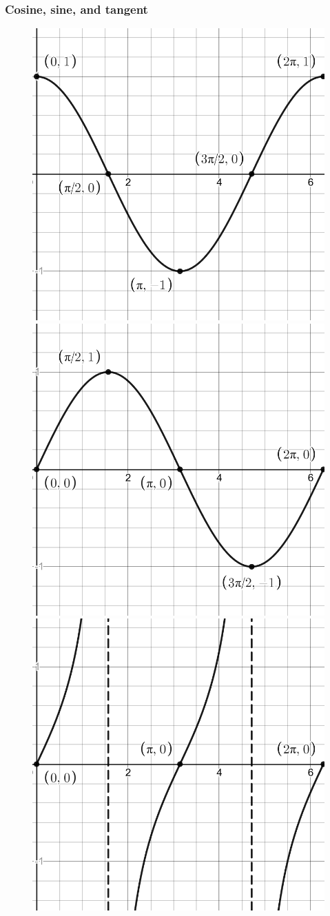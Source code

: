 \documentclass[letterpaper,9pt,fleqn]{extarticle}
\begin{document}
\subsubsection*{Cosine, sine, and tangent}
\vspace{-0.2in}
\begin{figure}[h]
\centering
\begin{minipage}{.333\textwidth}
  \centering
  \includegraphics[width=.25\linewidth]{desmos-graph-cos}
\end{minipage}%
\begin{minipage}{.333\textwidth}
  \centering
  \includegraphics[width=.25\linewidth]{desmos-graph-sine}
\end{minipage}%
\begin{minipage}{.333\textwidth}
  \centering
  \includegraphics[width=.25\linewidth]{desmos-graph-tan}
\end{minipage}
\end{figure}
\vspace{-0.2in}
\end{document}
